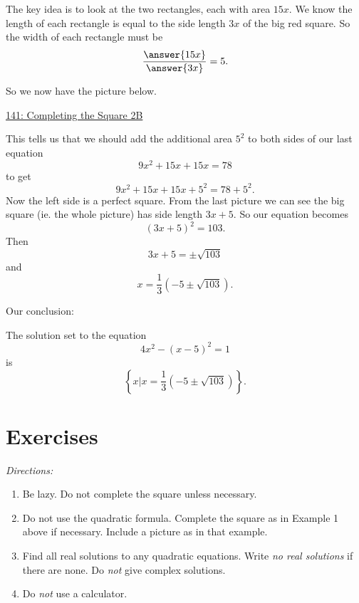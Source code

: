 \documentclass{ximera}
\begin{document}
\begin{example}
\begin{explanation}
The key idea is to look at the two rectangles, each with area $15x$. We know the length of each rectangle is equal to the side length $3x$ of the big red square. So the width of each rectangle must be
\[
    \frac{\answer{15x}}{\answer{3x}} = 5 .
\]

So we now have the picture below.

\begin{onlineOnly}
    \begin{center}
\end{center}
\end{onlineOnly}

\href{https://www.desmos.com/calculator/oglxjqw5iw}{141: Completing the Square 2B}

This tells us that we should add the additional area $5^2$ to both sides of our last equation
\[
      9x^2 + 15x + 15x = 78
\]
to get
\[
   9x^2 + 15x + 15x + 5^2 = 78 + 5^2 .
\]
Now the left side is a perfect square. From the last picture we can see the big square (ie. the whole picture) has side length $3x+5$. So our equation becomes
\[
   (3x + 5)^2 = 103 .
\]
Then 
\[
   3x + 5 = \pm \sqrt{103}
\]
and
\[
     x = \frac{1}{3}\left( -5 \pm \sqrt{103}  \right) .
\]

Our conclusion:

The solution set to the equation
\[
      4x^2 - (x-5)^2 = 1 
\]
is
\[
 \left\{ x | x =  \frac{1}{3}\left( -5 \pm \sqrt{103}  \right) \right\} .
\]
\end{explanation}

\end{example}


\section{Exercises}

\emph{Directions:}

\begin{enumerate}
\item Be lazy. Do not complete the square unless necessary. 

\item Do not use the quadratic formula. Complete the square as in Example 1 above if necessary. Include a picture as in that example.

\item Find all real solutions to any quadratic equations. Write \emph{no real solutions} if there are none. Do \emph{not} give complex solutions.

\item Do \emph{not} use a calculator.
\end{enumerate}
\end{document}
